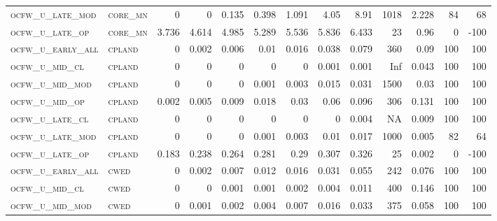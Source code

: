 \begin{landscape}
\begin{center}
\begin{footnotesize}
\begin{longtable}{llrrrrrrrr|rrr}
\textsc{ocfw\_u\_late\_mod } & \textsc{core\_mn  }   & 0        & 0        & 0.135    & 0.398    & 1.091    & 4.05     & 8.91      & 1018   & 2.228         & 84            & 68              \\
\textsc{ocfw\_u\_late\_op  } & \textsc{core\_mn  }   & 3.736    & 4.614    & 4.985    & 5.289    & 5.536    & 5.836    & 6.433     & 23     & 0.96          & 0             & -100            \\
\textsc{ocfw\_u\_early\_all} & \textsc{cpland    }   & 0        & 0.002    & 0.006    & 0.01     & 0.016    & 0.038    & 0.079     & 360    & 0.09          & 100           & 100             \\
\textsc{ocfw\_u\_mid\_cl   } & \textsc{cpland    }   & 0        & 0        & 0        & 0        & 0        & 0.001    & 0.001     & Inf    & 0.043         & 100           & 100             \\
\textsc{ocfw\_u\_mid\_mod  } & \textsc{cpland    }   & 0        & 0        & 0        & 0.001    & 0.003    & 0.015    & 0.031     & 1500   & 0.03          & 100           & 100             \\
\textsc{ocfw\_u\_mid\_op   } & \textsc{cpland    }   & 0.002    & 0.005    & 0.009    & 0.018    & 0.03     & 0.06     & 0.096     & 306    & 0.131         & 100           & 100             \\
\textsc{ocfw\_u\_late\_cl  } & \textsc{cpland    }   & 0        & 0        & 0        & 0        & 0        & 0        & 0.004     & NA     & 0.009         & 100           & 100             \\
\textsc{ocfw\_u\_late\_mod } & \textsc{cpland    }   & 0        & 0        & 0        & 0.001    & 0.003    & 0.01     & 0.017     & 1000   & 0.005         & 82            & 64              \\
\textsc{ocfw\_u\_late\_op  } & \textsc{cpland    }   & 0.183    & 0.238    & 0.264    & 0.281    & 0.29     & 0.307    & 0.326     & 25     & 0.002         & 0             & -100            \\
\textsc{ocfw\_u\_early\_all} & \textsc{cwed      }   & 0        & 0.002    & 0.007    & 0.012    & 0.016    & 0.031    & 0.055     & 242    & 0.076         & 100           & 100             \\
\textsc{ocfw\_u\_mid\_cl   } & \textsc{cwed      }   & 0        & 0        & 0.001    & 0.001    & 0.002    & 0.004    & 0.011     & 400    & 0.146         & 100           & 100             \\
\textsc{ocfw\_u\_mid\_mod  } & \textsc{cwed      }   & 0        & 0.001    & 0.002    & 0.004    & 0.007    & 0.016    & 0.033     & 375    & 0.058         & 100           & 100             \\

\end{longtable}
\end{footnotesize}
\end{center}
\end{landscape}
